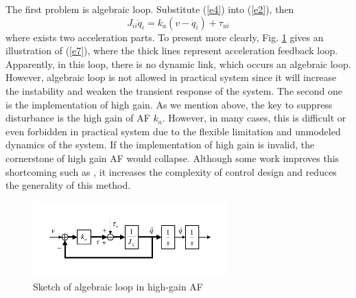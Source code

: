 \documentclass[letterpaper, 10 pt, conference]{ieeeconf}  %
\begin{document}
The first problem is algebraic loop.
Substitute (\ref{e4}) into (\ref{e2}), then
\begin{equation}
    J_{ii}\ddot{q}_i=k_a(v-\ddot{q}_i) + \tau_{ui}
    \label{e7}
\end{equation}
where exists two acceleration parts.
To present more clearly, Fig. \ref{f1} gives an illustration of (\ref{e7}), where the thick lines represent acceleration feedback loop.
Apparently, in this loop, there is no dynamic link, which occurs an algebraic loop.
However, algebraic loop is not allowed in practical system since it will increase the instability and weaken the transient response of the system.
The second one is the implementation of high gain.
As we mention above, the key to suppress disturbance is the high gain of AF $k_a$.
However, in many cases, this is difficult or even forbidden in practical system due to the flexible limitation and unmodeled dynamics of the system.
If the implementation of high gain is invalid, the cornerstone of high gain AF would collapse.
Although some work improves this shortcoming such as \cite{Han2000}, it increases the complexity of control design and reduces the generality of this method.
\begin{figure}[t]
    \centering
    \includegraphics[width=2.95in]{illustrations/fig1.pdf}
    \caption{Sketch of algebraic loop in high-gain AF}
    \label{f1}
\end{figure}
\end{document}
